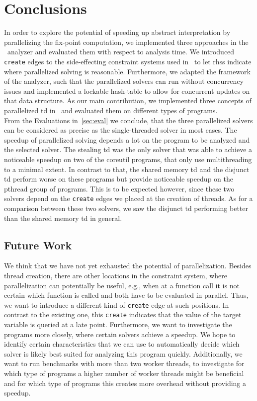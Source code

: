 \section{Conclusions}
\label{sec:conclusions}
In order to explore the potential of speeding up abstract interpretation by parallelizing the fix-point computation, we implemented three approaches in the \gob\ analyzer and evaluated them with respect to analysis time.
We introduced \texttt{create} edges to the side-effecting constraint systems used in \gob\ to let \acp{rhs} indicate where parallelized solving is reasonable. Furthermore, we adapted the framework of the analyzer, such that the parallelized solvers can run without concurrency issues and implemented a lockable hash-table to allow for concurrent updates on that data structure. As our main contribution, we implemented three concepts of parallelized \acl{td} in \gob\ and evaluated them on different types of programs.\\
From the Evaluations in~\autoref{sec:eval} we conclude, that the three parallelized solvers can be considered as precise as the single-threaded solver in most cases. The speedup of parallelized solving depends a lot on the program to be analyzed and the selected solver. The stealing \ac{td} was the only solver that was able to achieve a noticeable speedup on two of the coreutil programs, that only use multithreading to a minimal extent. In contrast to that, the shared memory \ac{td} and the disjunct \ac{td} perform worse on these programs but provide noticeable speedup on the pthread group of programs. This is to be expected however, since these two solvers depend on the \texttt{create} edges we placed at the creation of threads. As for a comparison between these two solvers, we saw the disjunct \ac{td} performing better than the shared memory \ac{td} in general.

  \label{sec:conclusions:futureWork} 
  \subsection{Future Work}
  We think that we have not yet exhausted the potential of parallelization. Besides thread creation, there are other locations in the constraint system, where parallelization can potentially be useful, e.g., when at a function call it is not certain which function is called and both have to be evaluated in parallel. Thus, we want to introduce a different kind of \texttt{create} edge at such positions. In contrast to the existing one, this \texttt{create} indicates that the value of the target variable is queried at a late point.
  Furthermore, we want to investigate the programs more closely, where certain solvers achieve a speedup. We hope to identify certain characteristics that we can use to automatically decide which solver is likely best suited for analyzing this program quickly. Additionally, we want to run benchmarks with more than two worker threads, to investigate for which type of programs a higher number of worker threads might be beneficial and for which type of programs this creates more overhead without providing a speedup.